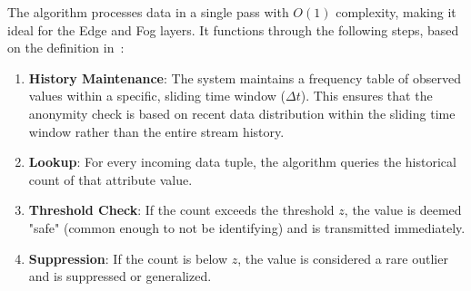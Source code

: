 The algorithm processes data in a single pass with $O(1)$ complexity, making it ideal for the Edge and Fog layers. It functions through the following steps, based on the definition in~\cite{zanonDataStreams}:
\begin{enumerate}


    \item \textbf{History Maintenance}: The system maintains a frequency table of observed values within a specific, sliding time window ($\Delta t$). This ensures that the anonymity check is based on recent data distribution within the sliding time window rather than the entire stream history.


    \item \textbf{Lookup}: For every incoming data tuple, the algorithm queries the historical count of that attribute value.



    \item \textbf{Threshold Check}: If the count exceeds the threshold $z$, the value is deemed "safe" (common enough to not be identifying) and is transmitted immediately.

    \item \textbf{Suppression}: If the count is below $z$, the value is considered a rare outlier and is suppressed or generalized.


\end{enumerate}



